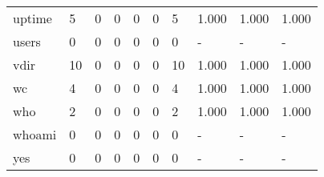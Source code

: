 \begin{longtable}{lp{1.3cm}p{1.3cm}p{1.3cm}p{1.3cm}p{1.3cm}p{1.3cm}p{1.3cm}p{1.3cm}p{1.3cm}}
uptime    &                      5 &                                  0 &                                 0 &                                0 &                                 0 &                               5 &                                1.000 &                                  1.000 &                                1.000 \\
users     &                      0 &                                  0 &                                 0 &                                0 &                                 0 &                               0 &                                    - &                                      - &                                    - \\
vdir      &                     10 &                                  0 &                                 0 &                                0 &                                 0 &                              10 &                                1.000 &                                  1.000 &                                1.000 \\
wc        &                      4 &                                  0 &                                 0 &                                0 &                                 0 &                               4 &                                1.000 &                                  1.000 &                                1.000 \\
who       &                      2 &                                  0 &                                 0 &                                0 &                                 0 &                               2 &                                1.000 &                                  1.000 &                                1.000 \\
whoami    &                      0 &                                  0 &                                 0 &                                0 &                                 0 &                               0 &                                    - &                                      - &                                    - \\
yes       &                      0 &                                  0 &                                 0 &                                0 &                                 0 &                               0 &                                    - &                                      - &                                    - \\
\end{longtable}
